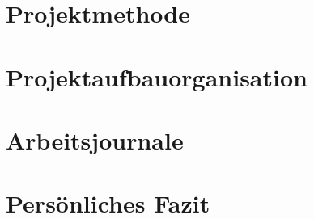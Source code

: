 \chapter{Projektmethode}

\chapter{Projektaufbauorganisation}



\chapter{Arbeitsjournale}











\chapter{Persönliches Fazit}